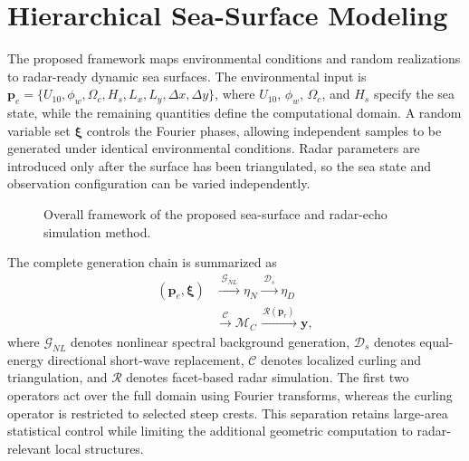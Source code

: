 \section{Hierarchical Sea-Surface Modeling}







The proposed framework maps environmental conditions and random realizations to radar-ready dynamic sea surfaces. The environmental input is $\boldsymbol{p}_e=\{U_{10},\phi_w,\Omega_c,H_s,L_x,L_y,\Delta x,\Delta y\}$, where $U_{10}$, $\phi_w$, $\Omega_c$, and $H_s$ specify the sea state, while the remaining quantities define the computational domain. A random variable set $\boldsymbol{\xi}$ controls the Fourier phases, allowing independent samples to be generated under identical environmental conditions. Radar parameters are introduced only after the surface has been triangulated, so the sea state and observation configuration can be varied independently.

\begin{figure}[!t]
\centering
{}
\caption{Overall framework of the proposed sea-surface and radar-echo simulation method.}
\label{fig:overall_framework}
\end{figure}

The complete generation chain is summarized as
\begin{equation}
\begin{aligned}
(\boldsymbol{p}_e,\boldsymbol{\xi})
&\xrightarrow{\;\mathcal{G}_{NL}\;}\eta_N
\xrightarrow{\;\mathcal{D}_s\;}\eta_D\\
&\xrightarrow{\;\mathcal{C}\;}\mathcal{M}_C
\xrightarrow{\;\mathcal{R}(\boldsymbol{p}_r)\;}\boldsymbol{y},
\end{aligned}
\label{eq:complete_simulation_chain}
\end{equation}
where $\mathcal{G}_{NL}$ denotes nonlinear spectral background generation, $\mathcal{D}_s$ denotes equal-energy directional short-wave replacement, $\mathcal{C}$ denotes localized curling and triangulation, and $\mathcal{R}$ denotes facet-based radar simulation. The first two operators act over the full domain using Fourier transforms, whereas the curling operator is restricted to selected steep crests. This separation retains large-area statistical control while limiting the additional geometric computation to radar-relevant local structures.












